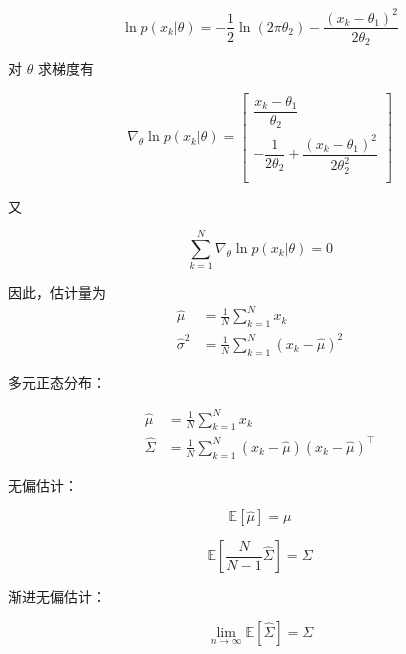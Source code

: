 \documentclass[openany,a4paper,12pt]{ctexbook}
\theoremstyle{kaiti}
\theoremstyle{normal}
\begin{document}
\begin{equation}
\ln p(x_k|\theta)=-\frac{1}{2}\ln \left(2\pi \theta_2 \right)-\frac{\left(x_k-\theta_1 \right)^2}{2\theta_2}
\end{equation}

对 $\theta$ 求梯度有

\begin{equation}
\nabla_{\theta}\ln p(x_k|\theta)
=\begin{bmatrix}
  \dfrac{x_k-\theta_1}{\theta_2}\\ 
  -\dfrac{1}{2\theta_2}+\dfrac{\left(x_k-\theta_1 \right)^2}{2\theta_{2}^{2}}\\
\end{bmatrix}
\end{equation}

又

\begin{equation}
\sum_{k=1}^N{\nabla_{\theta}\ln p(x_k|\theta)}=0
\end{equation}

因此，估计量为
\begin{equation}
\begin{aligned}
  \hat{\mu}&=\frac{1}{N}\sum_{k=1}^N{x_k} \\
  \hat{\sigma}^2&=\frac{1}{N}\sum_{k=1}^N{\left(x_k-\hat{\mu} \right)^2}
\end{aligned}
\end{equation}

多元正态分布：

\begin{equation}
\begin{aligned}
  \hat{\mu}&=\frac{1}{N}\sum_{k=1}^N{x_k}\\
  \hat{\Sigma}&=\frac{1}{N}\sum_{k=1}^N{\left(x_k-\hat{\mu} \right)\left(x_k-\hat{\mu} \right)^{\top}}
\end{aligned}
\end{equation}

无偏估计：

\begin{equation}
\mathbb{E} \left[\hat{\mu} \right] =\mu
\end{equation}

\begin{equation}
\mathbb{E} \left[\frac{N}{N-1}\hat{\Sigma}\right] =\Sigma
\end{equation}

渐进无偏估计：

\begin{equation}
\lim_{n\rightarrow \infty} \mathbb{E} \left[\hat{\Sigma} \right] =\Sigma
\end{equation}
\end{document}
